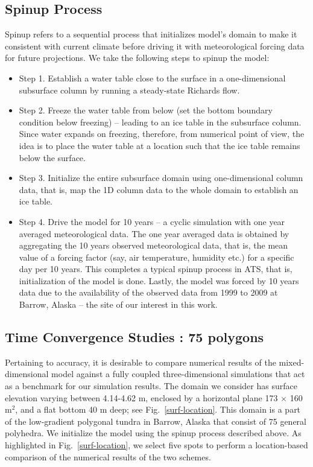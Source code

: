 \documentclass[review]{elsarticle}
\begin{document}
\subsection{Spinup Process}
Spinup  refers to a sequential process that initializes model's domain to make it consistent with current climate before driving it with meteorological forcing data for future projections. We take the following steps to spinup the model:
\begin{itemize}
\item{ Step 1. Establish a water table close to the surface in a one-dimensional subsurface column by running a steady-state Richards flow.}
\item{Step 2. Freeze the water table from below (set the bottom boundary condition below freezing) -- leading to an ice table in the subsurface column. Since water expands on freezing, therefore, from numerical point of view, the idea is to place the water table at a location such that the ice table remains below the surface.}
\item{Step 3. Initialize the entire subsurface domain using one-dimensional column data, that is, map the 1D column data to the whole domain to establish an ice table.
}
\item{Step 4. Drive the model for 10 years -- a cyclic simulation with one year averaged meteorological data. The one year averaged data is obtained by aggregating the 10 years observed meteorological data, that is, the mean value of a forcing factor (say, air temperature, humidity etc.) for a specific day per 10 years. This completes a typical spinup process in ATS, that is, initialization of the model is done. Lastly, the model was forced by 10 years data due to the availability of the observed data from 1999 to 2009 at Barrow, Alaska -- the site of our interest in this work.}
 \end{itemize}
 
 \subsection {Time Convergence Studies : 75 polygons}   
 
Pertaining to accuracy,  it is desirable to compare numerical results of the mixed-dimensional model against a fully coupled three-dimensional simulations that act as a benchmark for our simulation results. The domain we consider has surface elevation varying between 4.14-4.62 m, enclosed by a horizontal plane 173 $\times$ 160 m$^2$, and a flat bottom 40 m deep; see Fig.~\ref{surf-location}. This domain is a part of the low-gradient polygonal tundra in Barrow, Alaska that consist of 75 general polyhedra. We initialize the model using the spinup process described above. As highlighted in Fig.~\ref{surf-location}, we select five spots to perform a location-based comparison of the numerical results of the two schemes.
\end{document}
